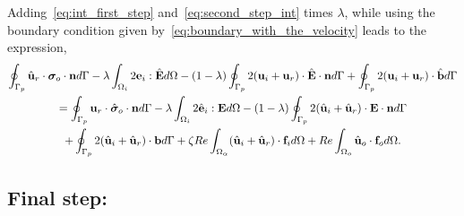 Adding~\ref{eq:int_first_step} and~\ref{eq:second_step_int} times $\lambda$, while using the boundary condition given by~\ref{eq:boundary_with_the_velocity} leads to the expression,
\begin{multline}
    \intS[p]{\hat{\textbf{u}}_{r} \cdot  \bm\sigma_{o}\cdot \textbf{n}}
    -\lambda \intO[i]{2\textbf{e}_i : \hat{\textbf{E}}}
    - (1-\lambda) \intS[p]{2(\textbf{u}_{i} + \textbf{u}_r)\cdot \hat{\textbf{E}}\cdot \textbf{n}}
    + \intS[p]{2(\textbf{u}_{i} + \textbf{u}_r)\cdot \hat{\textbf{b}}}
    \\
    =
    \intS[p]{\textbf{u}_{r}\cdot \hat{\bm\sigma}_{o}\cdot \textbf{n}}
    - \lambda \intO[i]{2\hat{\textbf{e}}_i :\textbf{E}}
    - (1-\lambda) \intS[p]{2(\hat{\textbf{u}}_{i} + \hat{\textbf{u}}_r) \cdot  \textbf{E} \cdot \textbf{n}}\\ 
    + \intS[p]{2(\hat{\textbf{u}}_{i} + \hat{\textbf{u}}_r) \cdot  \textbf{b}}
    + \zeta Re \intO{(\hat{\textbf{u}}_i+\hat{\textbf{u}}_r)\cdot \textbf{f}_{i}} 
    + Re\intO[o]{\hat{\textbf{u}}_{o}\cdot \textbf{f}_{o}}.
    \label{eq:int_third_step}
\end{multline}

\subsection{Final step:}

